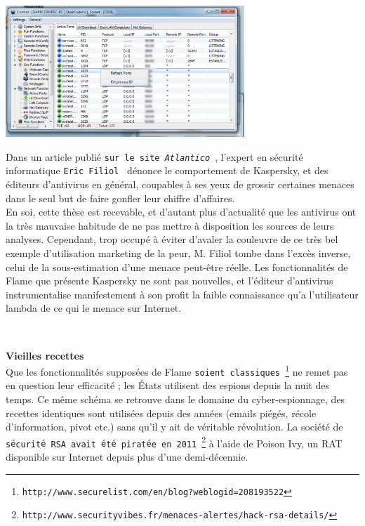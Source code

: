 \documentclass[11pt,twoside,a4paper]{article}
\begin{document}
\begin{minipage}[ht]{9.25cm}
	\includegraphics[width=9.00cm]{img/Flame-marketing-malware-e1338559312558.png}
\end{minipage} \hfill \begin{minipage}[ht]{9.50cm}
	\small
	Dans un article publi{\'e} \texttt{sur le site \emph{Atlantico}~\footnotemark}, l'expert en s{\'e}curit{\'e} informatique \texttt{Eric Filiol~\footnotemark} d{\'e}nonce le comportement de Kaspersky, et des {\'e}diteurs d'antivirus en g{\'e}n{\'e}ral, coupables {\`a} ses yeux de grossir certaines menaces dans le seul but de faire gonfler leur chiffre d'affaires.~\\

	En soi, cette th{\`e}se est recevable, et d'autant plus d'actualit{\'e} que les antivirus ont la tr{\`e}s mauvaise habitude de ne pas mettre {\`a} disposition les sources de leurs analyses. Cependant, trop occup{\'e} {\`a} {\'e}viter d'avaler la couleuvre de ce tr{\`e}s bel exemple d'utilisation marketing de la peur, M. Filiol tombe dans l'exc{\`e}s inverse, celui de la sous-estimation d'une menace peut-{\^e}tre r{\'e}elle. Les fonctionnalit{\'e}s de Flame que pr{\'e}sente Kaspersky ne sont pas nouvelles, et l'{\'e}diteur d'antivirus instrumentalise manifestement {\`a} son profit la faible connaissance qu'a l'utilisateur lambda de ce qui le menace sur Internet.~\\
\end{minipage}

~
~

\textbf{\large Vieilles recettes}~\\

Que les fonctionnalit{\'e}s suppos{\'e}es de Flame \texttt{soient classiques~\footnote{http://www.securelist.com/en/blog?weblogid=208193522}} ne remet pas en question leur efficacit{\'e} ; les {\'E}tats utilisent des espions depuis la nuit des temps. Ce m{\^e}me sch{\'e}ma se retrouve dans le domaine du cyber-espionnage, des recettes identiques sont utilis{\'e}es depuis des ann{\'e}es (emails pi{\'e}g{\'e}s, r{\'e}cole d'information, pivot etc.) sans qu'il y ait de v{\'e}ritable r{\'e}volution. La soci{\'e}t{\'e} de \texttt{s{\'e}curit{\'e} RSA avait {\'e}t{\'e} pirat{\'e}e en 2011~\footnote{\texttt{http://www.securityvibes.fr/menaces-alertes/hack-rsa-details/}}} {\`a} l'aide de Poison Ivy, un RAT disponible sur Internet depuis plus d'une demi-d{\'e}cennie.~\\
\end{document}
